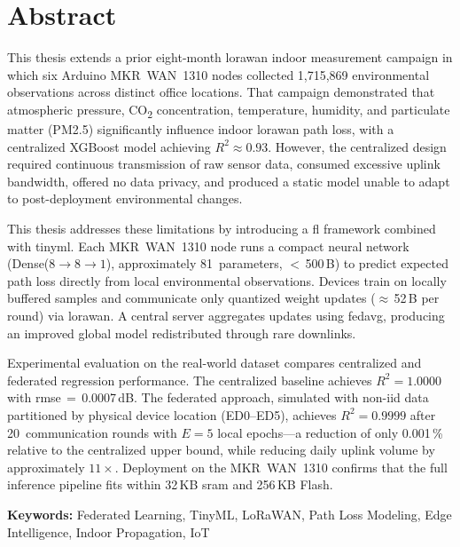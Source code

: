 \documentclass[12pt, a4paper, twoside, openright]{report}
\begin{document}
\chapter*{Abstract}

This thesis extends a prior eight-month \gls{lorawan} indoor measurement campaign in which six Arduino MKR~WAN~1310 nodes collected 1,715,869 environmental observations across distinct office locations. That campaign demonstrated that atmospheric pressure, CO\textsubscript{2} concentration, temperature, humidity, and particulate matter (PM2.5) significantly influence indoor \gls{lorawan} path loss, with a centralized XGBoost model achieving $R^2 \approx 0.93$. However, the centralized design required continuous transmission of raw sensor data, consumed excessive uplink bandwidth, offered no data privacy, and produced a static model unable to adapt to post-deployment environmental changes.

This thesis addresses these limitations by introducing a \gls{fl} framework combined with \gls{tinyml}. Each MKR~WAN~1310 node runs a compact neural network (Dense($8\!\to\!8\!\to\!1$), approximately 81~parameters, ${<}$\,500\,B) to predict expected path loss directly from local environmental observations. Devices train on locally buffered samples and communicate only quantized weight updates ($\approx$\,52\,B per round) via \gls{lorawan}. A central server aggregates updates using \gls{fedavg}, producing an improved global model redistributed through rare downlinks.

Experimental evaluation on the real-world dataset compares centralized and federated regression performance. The centralized baseline achieves $R^2 = 1.0000$ with \gls{rmse}\,$=$\,0.0007\,dB. The federated approach, simulated with non-\gls{iid} data partitioned by physical device location (ED0--ED5), achieves $R^2 = 0.9999$ after 20~communication rounds with $E=5$ local epochs---a reduction of only 0.001\,\% relative to the centralized upper bound, while reducing daily uplink volume by approximately $11\times$. Deployment on the MKR~WAN~1310 confirms that the full inference pipeline fits within 32\,KB \gls{sram} and 256\,KB Flash.

\noindent\textbf{Keywords:} Federated Learning, TinyML, LoRaWAN, Path Loss Modeling, Edge Intelligence, Indoor Propagation, IoT
\newpage

\thispagestyle{empty}
\mbox{}
\newpage
\end{document}
